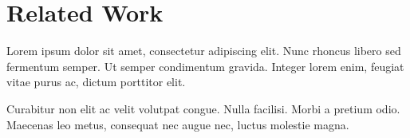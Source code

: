 \section{Related Work}
\label{sec:related}

Lorem ipsum dolor sit amet, consectetur adipiscing elit. Nunc rhoncus libero sed fermentum semper. Ut semper condimentum gravida. Integer lorem enim, feugiat vitae purus ac, dictum porttitor elit.

\medskip
Curabitur non elit ac velit volutpat congue. Nulla facilisi. Morbi a pretium odio. Maecenas leo metus, consequat nec augue nec, luctus molestie magna.
